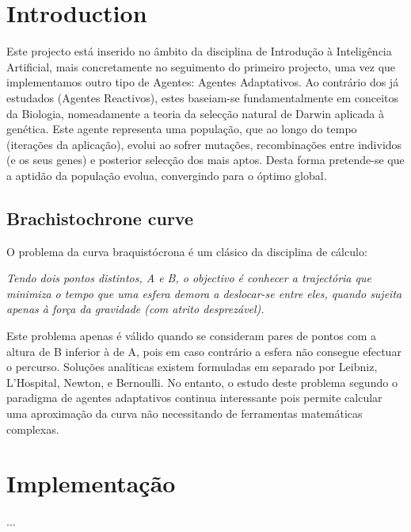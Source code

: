 \documentclass[a4paper]{article}
\title{\documentTitle}
\author{\documentAuthors{}}
\begin{document}
\renewcommand{\figurename}{Figure}
\maketitle
\cleardoublepage

\tableofcontents
\cleardoublepage

\setlength{\parindent}{1cm}
\setlength{\parskip}{0.3cm}

\section{Introduction}
\indent \indent Este projecto está inserido no âmbito da disciplina de Introdução à Inteligência Artificial,
mais concretamente no seguimento do primeiro projecto, uma vez que implementamos outro tipo de Agentes: Agentes Adaptativos.
Ao contrário dos já estudados (Agentes Reactivos), estes baseiam-se fundamentalmente em conceitos da Biologia, nomeadamente a teoria da selecção natural de Darwin aplicada à genética.
Este agente representa uma população, que ao longo do tempo (iterações da aplicação), evolui ao sofrer mutações, recombinações entre individos (e os seus genes) e posterior selecção dos mais aptos.
Desta forma pretende-se que a aptidão da população evolua, convergindo para o óptimo global.

\subsection{Brachistochrone curve}
\indent \indent O problema da curva braquistócrona é um clásico da disciplina de cálculo:

\emph{Tendo dois pontos distintos, A e B, o objectivo é conhecer a trajectória que minimiza o tempo que uma esfera demora a deslocar-se entre eles, quando sujeita apenas à força da gravidade (com atrito desprezável).}

\indent Este problema apenas é válido quando se consideram pares de pontos com a altura de B inferior à de A, pois em caso contrário a esfera não consegue efectuar o percurso.
Soluções analíticas existem formuladas em separado por Leibniz, L'Hospital, Newton, e Bernoulli. No entanto, o estudo deste problema segundo o paradigma de agentes adaptativos continua interessante pois permite calcular uma aproximação da curva
não necessitando de ferramentas matemáticas complexas.

\cleardoublepage
\section{Implementação}
\indent \indent ...
\end{document}

